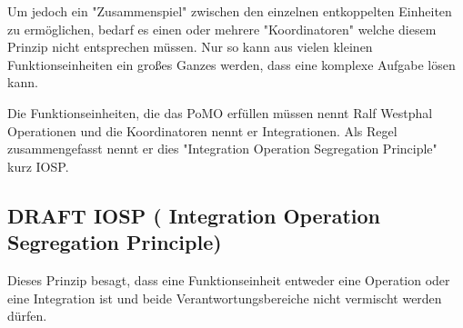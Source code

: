 \documentclass[a4paper,12pt,oneside]{book}
\begin{document}
Um jedoch ein "Zusammenspiel" zwischen den einzelnen entkoppelten Einheiten zu ermöglichen, bedarf es einen oder
mehrere "Koordinatoren" welche diesem Prinzip nicht entsprechen müssen.
Nur so kann aus vielen kleinen Funktionseinheiten ein großes Ganzes werden, dass eine komplexe Aufgabe lösen kann.

Die Funktionseinheiten, die das PoMO erfüllen müssen nennt Ralf Westphal Operationen und die Koordinatoren nennt er
Integrationen. Als Regel zusammengefasst nennt er dies "Integration Operation Segregation Principle" kurz IOSP.


\subsection{DRAFT IOSP ( Integration Operation Segregation Principle)}
\label{sec-4-1-3}

Dieses Prinzip besagt, dass eine Funktionseinheit entweder eine Operation oder eine Integration ist und beide
Verantwortungsbereiche nicht vermischt werden dürfen.
\end{document}

